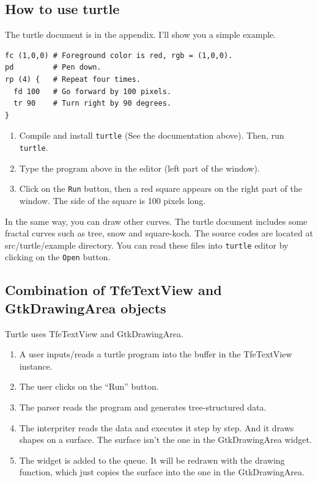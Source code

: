 \subsection{How to use turtle}\label{how-to-use-turtle}

The turtle document is in the appendix. I'll show you a simple example.

\begin{lstlisting}
fc (1,0,0) # Foreground color is red, rgb = (1,0,0).
pd         # Pen down.
rp (4) {   # Repeat four times.
  fd 100   # Go forward by 100 pixels.
  tr 90    # Turn right by 90 degrees.
}
\end{lstlisting}

\begin{enumerate}
\def\labelenumi{\arabic{enumi}.}
\tightlist
\item
  Compile and install \passthrough{\lstinline!turtle!} (See the
  documentation above). Then, run \passthrough{\lstinline!turtle!}.
\item
  Type the program above in the editor (left part of the window).
\item
  Click on the \passthrough{\lstinline!Run!} button, then a red square
  appears on the right part of the window. The side of the square is 100
  pixels long.
\end{enumerate}

In the same way, you can draw other curves. The turtle document includes
some fractal curves such as tree, snow and square-koch. The source codes
are located at src/turtle/example directory. You can read these files
into \passthrough{\lstinline!turtle!} editor by clicking on the
\passthrough{\lstinline!Open!} button.

\subsection{Combination of TfeTextView and GtkDrawingArea
objects}\label{combination-of-tfetextview-and-gtkdrawingarea-objects}

Turtle uses TfeTextView and GtkDrawingArea.

\begin{enumerate}
\def\labelenumi{\arabic{enumi}.}
\tightlist
\item
  A user inputs/reads a turtle program into the buffer in the
  TfeTextView instance.
\item
  The user clicks on the ``Run'' button.
\item
  The parser reads the program and generates tree-structured data.
\item
  The interpriter reads the data and executes it step by step. And it
  draws shapes on a surface. The surface isn't the one in the
  GtkDrawingArea widget.
\item
  The widget is added to the queue. It will be redrawn with the drawing
  function, which just copies the surface into the one in the
  GtkDrawingArea.
\end{enumerate}

